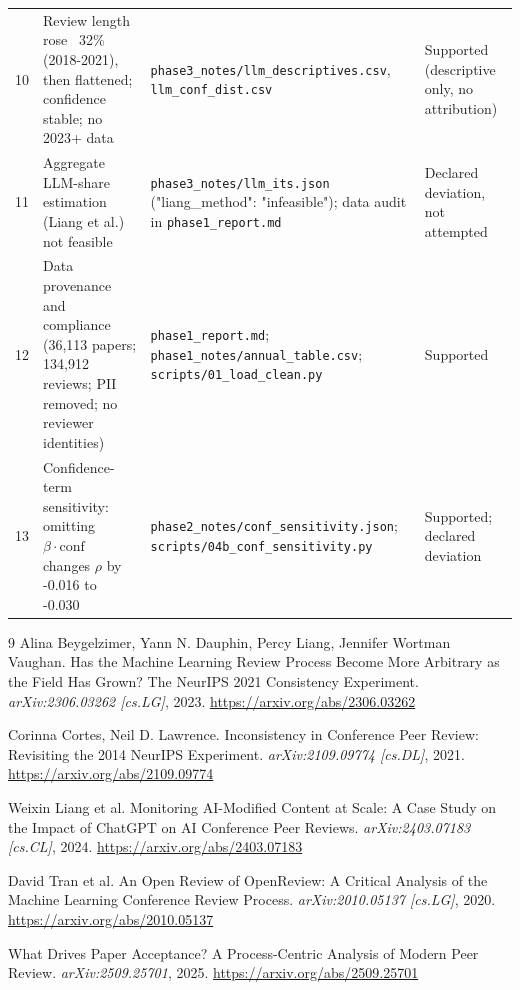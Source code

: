\documentclass[10pt]{article}
\begin{document}
\begin{table}[t]
\begin{tabular}{c p{5.2cm} p{5.2cm} p{3.2cm}}
10 & Review length rose ~32\% (2018-2021), then flattened; confidence stable; no 2023+ data & \texttt{phase3\_notes/llm\_descriptives.csv}, \texttt{llm\_conf\_dist.csv} & Supported (descriptive only, no attribution) \\
11 & Aggregate LLM-share estimation (Liang et al.) not feasible & \texttt{phase3\_notes/llm\_its.json} ("liang\_method": "infeasible"); data audit in \texttt{phase1\_report.md} & Declared deviation, not attempted \\
12 & Data provenance and compliance (36,113 papers; 134,912 reviews; PII removed; no reviewer identities) & \texttt{phase1\_report.md}; \texttt{phase1\_notes/annual\_table.csv}; \texttt{scripts/01\_load\_clean.py} & Supported \\
13 & Confidence-term sensitivity: omitting $\beta\cdot\mathrm{conf}$ changes $\rho$ by -0.016 to -0.030 & \texttt{phase2\_notes/conf\_sensitivity.json}; \texttt{scripts/04b\_conf\_sensitivity.py} & Supported; declared deviation \\
\bottomrule
\end{tabular}
\end{table}


\begin{thebibliography}{9}
Alina Beygelzimer, Yann N. Dauphin, Percy Liang, Jennifer Wortman Vaughan. Has the Machine Learning Review Process Become More Arbitrary as the Field Has Grown? The NeurIPS 2021 Consistency Experiment. \textit{arXiv:2306.03262 [cs.LG]}, 2023. \url{https://arxiv.org/abs/2306.03262}

Corinna Cortes, Neil D. Lawrence. Inconsistency in Conference Peer Review: Revisiting the 2014 NeurIPS Experiment. \textit{arXiv:2109.09774 [cs.DL]}, 2021. \url{https://arxiv.org/abs/2109.09774}

Weixin Liang et al. Monitoring AI-Modified Content at Scale: A Case Study on the Impact of ChatGPT on AI Conference Peer Reviews. \textit{arXiv:2403.07183 [cs.CL]}, 2024. \url{https://arxiv.org/abs/2403.07183}

David Tran et al. An Open Review of OpenReview: A Critical Analysis of the Machine Learning Conference Review Process. \textit{arXiv:2010.05137 [cs.LG]}, 2020. \url{https://arxiv.org/abs/2010.05137}

What Drives Paper Acceptance? A Process-Centric Analysis of Modern Peer Review. \textit{arXiv:2509.25701}, 2025. \url{https://arxiv.org/abs/2509.25701}
\end{thebibliography}
\end{document}
